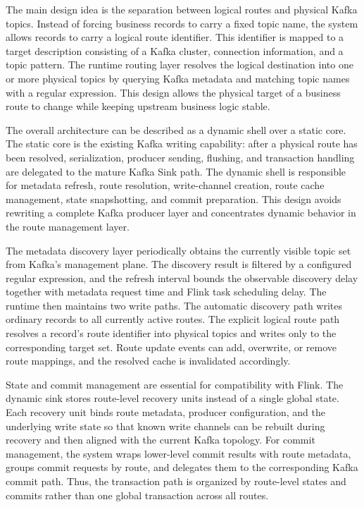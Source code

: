 The main design idea is the separation between logical routes and physical Kafka topics. Instead of forcing business records to carry a fixed topic name, the system allows records to carry a logical route identifier. This identifier is mapped to a target description consisting of a Kafka cluster, connection information, and a topic pattern. The runtime routing layer resolves the logical destination into one or more physical topics by querying Kafka metadata and matching topic names with a regular expression. This design allows the physical target of a business route to change while keeping upstream business logic stable.

The overall architecture can be described as a dynamic shell over a static core. The static core is the existing Kafka writing capability: after a physical route has been resolved, serialization, producer sending, flushing, and transaction handling are delegated to the mature Kafka Sink path. The dynamic shell is responsible for metadata refresh, route resolution, write-channel creation, route cache management, state snapshotting, and commit preparation. This design avoids rewriting a complete Kafka producer layer and concentrates dynamic behavior in the route management layer.

The metadata discovery layer periodically obtains the currently visible topic set from Kafka's management plane. The discovery result is filtered by a configured regular expression, and the refresh interval bounds the observable discovery delay together with metadata request time and Flink task scheduling delay. The runtime then maintains two write paths. The automatic discovery path writes ordinary records to all currently active routes. The explicit logical route path resolves a record's route identifier into physical topics and writes only to the corresponding target set. Route update events can add, overwrite, or remove route mappings, and the resolved cache is invalidated accordingly.

State and commit management are essential for compatibility with Flink. The dynamic sink stores route-level recovery units instead of a single global state. Each recovery unit binds route metadata, producer configuration, and the underlying write state so that known write channels can be rebuilt during recovery and then aligned with the current Kafka topology. For commit management, the system wraps lower-level commit results with route metadata, groups commit requests by route, and delegates them to the corresponding Kafka commit path. Thus, the transaction path is organized by route-level states and commits rather than one global transaction across all routes.

